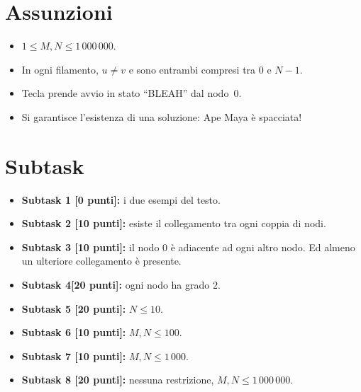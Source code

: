 \documentclass[a4paper,11pt]{article}
\begin{document}
\section*{Assunzioni}

\begin{itemize}[nolistsep, itemsep=2mm]
    \item $ 1 \leq M, N \leq 1\,000\,000$.
    \item In ogni filamento, $u \neq v$ e sono entrambi compresi tra $0$ e $N-1$.
    \item Tecla prende avvio in stato ``BLEAH'' dal nodo~$0$.
    \item Si garantisce l'esistenza di una soluzione: Ape Maya \`e spacciata!
\end{itemize}

\section*{Subtask}
\begin{itemize}
\item \textbf{Subtask 1 [0 punti]:} i due esempi del testo.
\item \textbf{Subtask 2 [10 punti]:} esiste il collegamento tra ogni coppia di nodi.
\item \textbf{Subtask 3 [10 punti]:} il nodo $0$ \`e adiacente ad ogni altro nodo. Ed almeno un ulteriore collegamento \`e presente.
\item \textbf{Subtask 4[20 punti]:} ogni nodo ha grado $2$.
\item \textbf{Subtask 5 [20 punti]:} $N \leq 10$.
\item \textbf{Subtask 6 [10 punti]:} $M,N \leq 100$.
\item \textbf{Subtask 7 [10 punti]:} $M,N \leq 1\,000$.
\item \textbf{Subtask 8 [20 punti]:} nessuna restrizione, $M,N \leq 1\,000\,000$.
\end{itemize}
\end{document}
